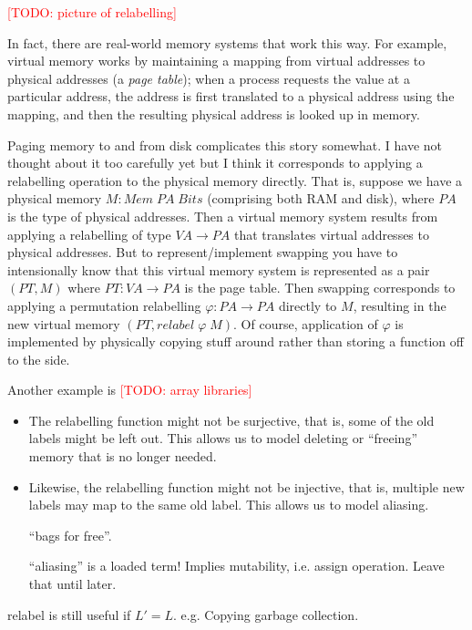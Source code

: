 \documentclass{jfp}
\newcommand{\term}[1]{\emph{#1}}
\newcommand{\todo}[1]{\textcolor{red}{[TODO: #1]}}
\newcommand{\todo}[1]{}
\begin{document}
\todo{picture of relabelling}

In fact, there are real-world memory systems that work this way.  For
example, virtual memory works by maintaining a mapping from virtual
addresses to physical addresses (a \term{page table}); when a process
requests the value at a particular address, the address is first
translated to a physical address using the mapping, and then
the resulting physical address is looked up in memory.
\begin{commentary}
  Paging memory to and from disk complicates this story somewhat.  I
  have not thought about it too carefully yet but I think it
  corresponds to applying a relabelling operation to the physical
  memory directly.  That is, suppose we have a physical memory
  $M : Mem\; PA\; Bits$ (comprising both RAM and disk), where $PA$ is
  the type of physical addresses.  Then a virtual memory system
  results from applying a relabelling of type $VA \to PA$ that
  translates virtual addresses to physical addresses.  But to
  represent/implement swapping you have to intensionally know that
  this virtual memory system is represented as a pair $(PT, M)$ where
  $PT : VA \to PA$ is the page table.  Then swapping corresponds to
  applying a permutation relabelling $\varphi : PA \to PA$ directly to
  $M$, resulting in the new virtual memory
  $(PT, \mathit{relabel}\; \varphi\; M)$.  Of course, application of
  $\varphi$ is implemented by physically copying stuff around rather
  than storing a function off to the side.
\end{commentary}
Another example is \todo{array libraries}

\begin{itemize}
\item The relabelling function might not be surjective, that is, some
  of the old labels might be left out. This allows us to model
  deleting or ``freeing'' memory that is no longer needed.
\item Likewise, the relabelling function might not be injective, that
  is, multiple new labels may map to the same old label.  This allows
  us to model aliasing.

  ``bags for free''.

  ``aliasing'' is a loaded term!  Implies mutability, i.e. assign
  operation.  Leave that until later.
\end{itemize}

\begin{commentary}
  relabel is still useful if $L' = L$.  e.g. Copying garbage collection.
\end{commentary}
\end{document}
